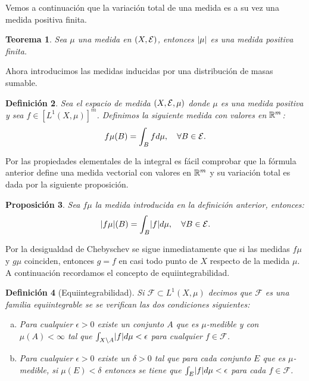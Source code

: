 \documentclass[a4paper,11pt,spanish, twoside, leqno]{tfm-uam}
\newtheorem{teo}{Teorema}[chapter]
\newtheorem{prop}[teo]{Proposición}
\newtheorem{defi}[teo]{Definición}
\begin{document}
Vemos a continuación que la variación total de una medida es a su vez una medida positiva finita.
\begin{teo}
Sea $\mu$ una medida en $(X,\mathcal{E})$, entonces $\lvert\mu\rvert$ es una medida positiva finita.
\end{teo}

Ahora introducimos las medidas inducidas por una distribución de masas sumable.
\begin{defi}\label{defi:fmu medida vectorial}
Sea el espacio de medida $(X,\mathcal{E}, \mu)$ donde $\mu$ es una medida positiva y sea $f\in [L^{1}(X,\mu)]^{m}$. Definimos la siguiente medida con valores en $\mathbb{R}^{m}$:
\begin{align*}
f\mu(B)=\int_{B}fd\mu,\quad \forall B\in \mathcal{E}.
\end{align*}
\end{defi}

Por las propiedades elementales de la integral es fácil comprobar que la fórmula anterior define una medida vectorial con valores en $\mathbb{R}^{m}$ y su variación total es dada por la siguiente proposición.
\begin{prop}\label{prop:variacion total de fmu medida vectorial}  
Sea $f\mu$ la medida introducida en la definición anterior, entonces:
\begin{align*}
\lvert f\mu\rvert(B)=\int_{B}\lvert f\rvert d\mu,\quad \forall B\in \mathcal{E}.
\end{align*}
\end{prop}

Por la desigualdad de Chebyschev se sigue inmediatamente que si las medidas $f\mu$ y $g\mu$ coinciden, entonces $g=f$ en casi todo punto de $X$ respecto de la medida $\mu$. A continuación recordamos el concepto de equiintegrabilidad.
\begin{defi}[Equiintegrabilidad]\label{defi:equiintegrabilidad} 
Si $\mathcal{F}\subset L^{1}(X,\mu)$ decimos que $\mathcal{F}$ es una familia equiintegrable se se verifican las dos condiciones siguientes:
\begin{enumerate}[(a)]
\item Para cualquier $\epsilon>0$ existe un conjunto $A$ que es $\mu$-medible y con $\mu(A)<\infty$ tal que $\int_{X\setminus A}\lvert f\rvert d\mu< \epsilon$ para cualquier $f\in \mathcal{F}$.
\item Para cualquier $\epsilon>0$ existe un $\delta>0$ tal que para cada conjunto $E$ que es $\mu$-medible, si $\mu(E)<\delta$ entonces se tiene que $\int_{E}\lvert f\rvert d\mu<\epsilon$ para cada $f\in \mathcal{F}$.
\end{enumerate}
\end{defi}
\end{document}
